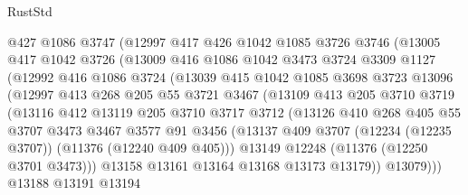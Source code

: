 \begin{lexlean}{RustStd}
\begin{coremodule}
{\begin{coremodule}
{{{{{{{{{{{{{{{{{{{{{{{{{{{{{{{{{{{{{{{{{{{{{{{{{{{{{{{{{{{{{{{{{{{{{{{{{{{{{{{{{{{{{              @427
              @1086
              @3747
              (@12997
                @417
                @426
                @1042
                @1085
                @3726
                @3746
                (@13005
                  @417
                  @1042
                  @3726
                  (@13009
                    @416
                    @1086
                    @1042
                    @3473
                    @3724
                    @3309
                    @1127
                    (@12992
                      @416
                      @1086
                      @3724
                      (@13039
                        @415
                        @1042
                        @1085
                        @3698
                        @3723
                        @13096
                        (@12997
                          @413
                          @268
                          @205
                          @55
                          @3721
                          @3467
                          (@13109
                            @413
                            @205
                            @3710
                            @3719
                            (@13116
                              @412
                              @13119
                              @205
                              @3710
                              @3717
                              @3712
                              (@13126
                                @410
                                @268
                                @405
                                @55
                                @3707
                                @3473
                                @3467
                                @3577
                                @91
                                @3456
                                (@13137
                                  @409
                                  @3707
                                  (@12234 (@12235 @3707))
                                  (@11376 (@12240 @409 @405)))
                                @13149
                                @12248
                                (@11376 (@12250 @3701 @3473)))
                              @13158
                              @13161
                              @13164
                              @13168
                              @13173
                              @13179))
                          @13079)))
                    @13188
                    @13191
                    @13194
}}}}}}}}}}}}}}}}}}}}}}}}}}}}}}}}}}}}}}}}}}}}}}}}}}}}}}}}}}}}}}}}}}}}}}}}}}}}}}}}}}}}}
\end{coremodule}}
\end{coremodule}
\end{lexlean}
